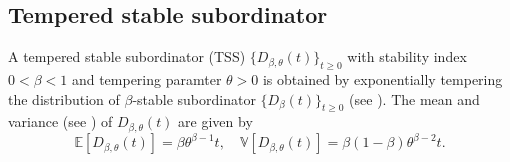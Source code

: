 \documentclass[11pt,oneside,reqno]{amsart}
\theoremstyle{definition}
\theoremstyle{remarkstyle}
\begin{document}
\subsection{Tempered stable subordinator}\label{TSS}
A tempered stable subordinator (TSS) $\{D_{\beta,\theta}(t)\}_{t\ge 0}$ with stability index $0<\beta<1$ and tempering paramter $\theta>0$ is obtained by exponentially tempering the distribution of $\beta$-stable subordinator $\{D_\beta(t)\}_{t\ge 0}$ (see \citet{Rosinski2007}). 
The mean and variance (see \citet{Gupta2020a}) of $D_{\beta,\theta}(t)$ are given by
\begin{equation*}
    \mathbb{E}\left[D_{\beta,\theta}(t)\right] = \beta\theta^{\beta-1}t,\quad\mathbb{V}\left[D_{\beta,\theta}(t)\right]=\beta(1-\beta)\theta^{\beta-2}t.
\end{equation*}
\end{document}
